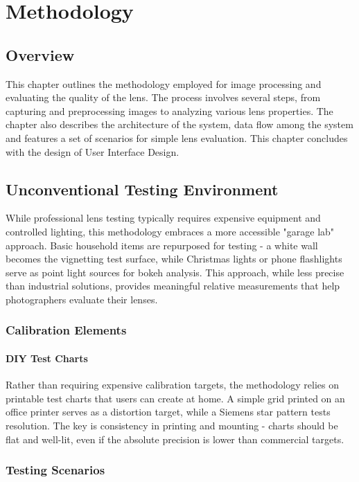 

\chapter{Methodology}

\section{Overview}
This chapter outlines the methodology employed for image processing and evaluating the quality of the lens. The process involves several steps, from capturing and preprocessing images to analyzing various lens properties. The chapter also describes the architecture of the system, data flow among the system and features a set of scenarios for simple lens evaluation. This chapter concludes with the design of User Interface Design.

\section{Unconventional Testing Environment}
While professional lens testing typically requires expensive equipment and controlled lighting, this methodology embraces a more accessible "garage lab" approach. Basic household items are repurposed for testing - a white wall becomes the vignetting test surface, while Christmas lights or phone flashlights serve as point light sources for bokeh analysis. This approach, while less precise than industrial solutions, provides meaningful relative measurements that help photographers evaluate their lenses.

\subsection{Calibration Elements}
\subsubsection{DIY Test Charts}
Rather than requiring expensive calibration targets, the methodology relies on printable test charts that users can create at home. A simple grid printed on an office printer serves as a distortion target, while a Siemens star pattern tests resolution. The key is consistency in printing and mounting - charts should be flat and well-lit, even if the absolute precision is lower than commercial targets.

\subsection{Testing Scenarios}

